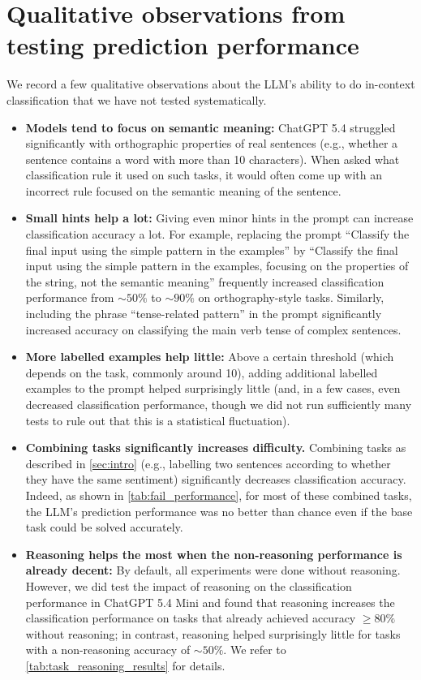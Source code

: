 \documentclass[11pt, letterpaper]{article}
\begin{document}
\section{Qualitative observations from testing prediction performance} \label{sec:qualitative}
We record a few qualitative observations about the LLM's ability to do in-context classification that we have not tested systematically.
\begin{itemize}
    \item \textbf{Models tend to focus on semantic meaning:} ChatGPT 5.4 struggled significantly with orthographic properties of real sentences (e.g., whether a sentence contains a word with more than 10 characters). When asked what classification rule it used on such tasks, it would often come up with an incorrect rule focused on the semantic meaning of the sentence.
    \item \textbf{Small hints help a lot:} Giving even minor hints in the prompt can increase classification accuracy a lot. For example, replacing the prompt ``Classify the final input using the simple pattern in the examples'' by ``Classify the final input using the simple pattern in the examples, focusing on the properties of the string, not the semantic meaning'' frequently increased classification performance from $\sim 50\%$ to $\sim 90\%$ on orthography-style tasks. Similarly, including the phrase ``tense-related pattern'' in the prompt significantly increased accuracy on classifying the main verb tense of complex sentences.
    \item \textbf{More labelled examples help little:} Above a certain threshold (which depends on the task, commonly around 10), adding additional labelled examples to the prompt helped surprisingly little (and, in a few cases, even decreased classification performance, though we did not run sufficiently many tests to rule out that this is a statistical fluctuation).
    \item \textbf{Combining tasks significantly increases difficulty.} Combining tasks as described in \cref{sec:intro} (e.g., labelling two sentences according to whether they have the same sentiment) significantly decreases classification accuracy.
Indeed, as shown in \cref{tab:fail_performance}, for most of these combined tasks, the LLM's prediction performance was no better than chance even if the base task could be solved accurately.
    \item \textbf{Reasoning helps the most when the non-reasoning performance is already decent:} By default, all experiments were done without reasoning. However, we did test the impact of reasoning on the classification performance in ChatGPT 5.4 Mini and found that reasoning increases the classification performance on tasks that already achieved accuracy $\geq 80\%$ without reasoning; in contrast, reasoning helped surprisingly little for tasks with a non-reasoning accuracy of $\sim50\%$. We refer to \cref{tab:task_reasoning_results} for details.
\end{itemize}
\end{document}

